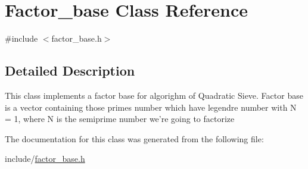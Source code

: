 \hypertarget{classFactor__base}{\section{Factor\-\_\-base Class Reference}
\label{classFactor__base}
}


{\ttfamily \#include $<$factor\-\_\-base.\-h$>$}



\subsection{Detailed Description}
This class implements a factor base for algorighm of Quadratic Sieve. Factor base is a vector containing those primes number which have legendre number with N = 1, where N is the semiprime number we're going to factorize 

The documentation for this class was generated from the following file\-:\begin{DoxyCompactItemize}
\item 
include/\hyperlink{factor__base_8h}{factor\-\_\-base.\-h}\end{DoxyCompactItemize}
